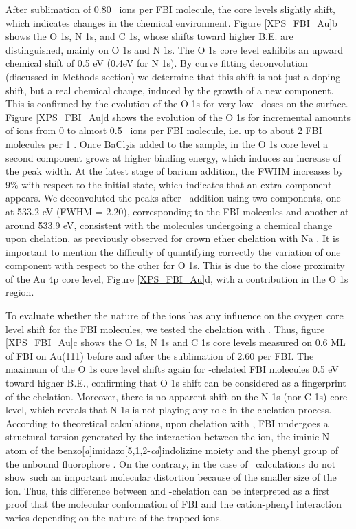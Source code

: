 \documentclass[aps,prl,reprint,longbibliography,superscriptaddress, english]{revtex4-1}
\def\BappCl{BaCl$_2$}
\begin{document}
After sublimation of 0.80 \Bapp\ ions per FBI molecule, the core levels slightly shift, which indicates changes in the chemical environment. Figure {\ref{XPS_FBI_Au}b} shows the O 1s, N 1s, and C 1s, whose shifts toward higher B.E. are distinguished, mainly on O 1s and N 1s. The O 1s core level exhibits an upward chemical shift of 0.5 eV (0.4eV for N 1s). By curve fitting deconvolution (discussed in Methods section) we determine that this shift is not just a doping shift, but a real chemical change, induced by the growth of a new component. This is confirmed by the evolution of the O 1s for very low \Bapp\ doses on the surface. Figure {\ref{XPS_FBI_Au}d} shows the evolution of the O 1s for incremental amounts of \Bapp ions from 0 to almost 0.5 \Bapp\ ions per FBI molecule, i.e. up to about 2 FBI {molecules} per 1 \Bapp. Once \BappCl is added to the sample, in the O 1s core level a second component grows at higher binding energy, which induces an increase of the peak width. At the latest stage of barium addition, the FWHM increases by 9\% with respect to the initial state, which indicates that an extra component appears. We deconvoluted the peaks after \Bapp\ addition using two components, one at 533.2 eV (FWHM = 2.20), corresponding to the FBI molecules and another at around 533.9 eV, consistent with the molecules undergoing a chemical change upon chelation, as previously observed for crown ether chelation with Na \cite{stredansky_-surface_2019}. It is important to mention the difficulty of quantifying correctly the variation of one component with respect to the other for O 1s. This is due to the close proximity of the Au 4p core level, Figure {\ref{XPS_FBI_Au}d}, with a contribution in the O 1s region.

To evaluate whether the nature of the ions has any influence on the oxygen core level shift for the FBI molecules, we tested the chelation with \Nap. Thus, figure {\ref{XPS_FBI_Au}c} shows the O 1s, N 1s and C 1s core levels measured on 0.6 ML of FBI on Au(111) before and after the sublimation of 2.60 \Nap per FBI. The maximum of the O 1s core level shifts again for \Nap-chelated FBI molecules 0.5 eV toward higher B.E., confirming that O 1s shift can be considered as a fingerprint of the chelation. Moreover, there is no apparent shift on the N 1s (nor C 1s) core level, which reveals that N 1s is not playing any role in the chelation process. According to theoretical calculations, upon chelation with \Bapp, FBI undergoes a structural torsion generated by the interaction between the ion, the iminic N atom of the benzo[\textit{a}]imidazo[5,1,2-\textit{cd}]indolizine moiety and the phenyl group of the unbound fluorophore \cite{rivilla_fluorescent_2020}. On the contrary, in the case of \Nap\ calculations do not show such an important molecular distortion because of the smaller size of the ion. Thus, this difference between \Bapp\- and \Nap-chelation can be interpreted as a first proof that the molecular conformation of FBI and the cation-phenyl interaction varies depending on the nature of the trapped ions. 
\end{document}

